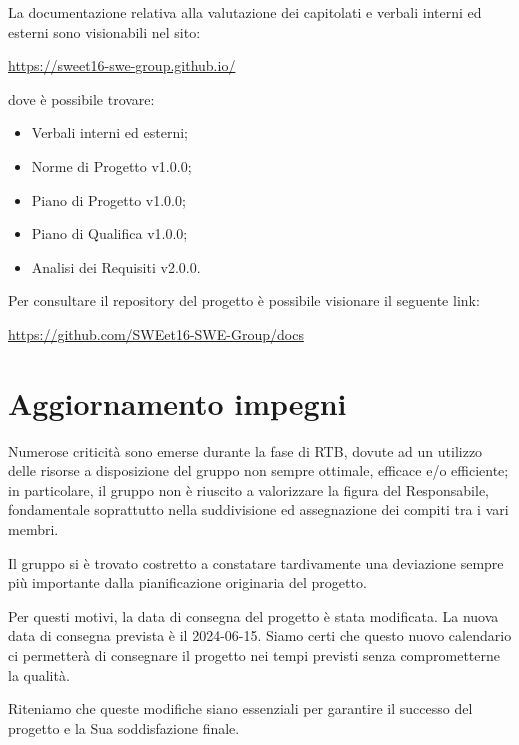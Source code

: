 \documentclass[a4paper, 11pt]{article}
\begin{document}
\par

La documentazione relativa alla valutazione dei capitolati e verbali
interni ed esterni sono visionabili nel sito:
\begin{center}
    \url{https://sweet16-swe-group.github.io/}
\end{center}
dove è possibile trovare:

\begin{itemize}
\item Verbali interni ed esterni;
\item Norme di Progetto v1.0.0;
\item Piano di Progetto v1.0.0;
\item Piano di Qualifica v1.0.0;
\item Analisi dei Requisiti v2.0.0.
\end{itemize}

Per consultare il repository del progetto è possibile visionare il seguente link:
\begin{center}
  \url{https://github.com/SWEet16-SWE-Group/docs}
\end{center}
\par
\section{Aggiornamento impegni}
Numerose criticità sono emerse durante la fase di RTB, dovute ad un utilizzo delle risorse a disposizione del gruppo non sempre ottimale, efficace e/o efficiente; in particolare,
il gruppo non è riuscito a valorizzare la figura del Responsabile, fondamentale soprattutto nella suddivisione ed assegnazione dei compiti tra i vari membri. \\
\par
Il gruppo si è trovato costretto a constatare tardivamente una deviazione sempre più importante dalla pianificazione originaria del progetto.
\par

Per questi motivi, la data di consegna del progetto è stata modificata. La nuova data di consegna
prevista è il 2024-06-15. Siamo certi che questo nuovo calendario ci permetterà di consegnare il
progetto nei tempi previsti senza comprometterne la qualità.

\par

Riteniamo che queste modifiche siano essenziali per garantire il successo del progetto e la Sua
soddisfazione finale.
\end{document}
